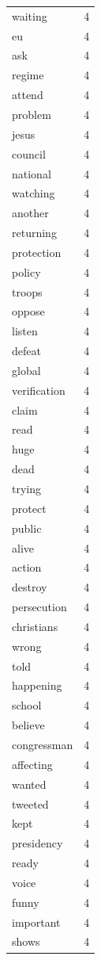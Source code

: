 \begin{tabular}{lr}
waiting & 4 \\
eu & 4 \\
ask & 4 \\
regime & 4 \\
attend & 4 \\
problem & 4 \\
jesus & 4 \\
council & 4 \\
national & 4 \\
watching & 4 \\
another & 4 \\
returning & 4 \\
protection & 4 \\
policy & 4 \\
troops & 4 \\
oppose & 4 \\
listen & 4 \\
defeat & 4 \\
global & 4 \\
verification & 4 \\
claim & 4 \\
read & 4 \\
huge & 4 \\
dead & 4 \\
trying & 4 \\
protect & 4 \\
public & 4 \\
alive & 4 \\
action & 4 \\
destroy & 4 \\
persecution & 4 \\
christians & 4 \\
wrong & 4 \\
told & 4 \\
happening & 4 \\
school & 4 \\
believe & 4 \\
congressman & 4 \\
affecting & 4 \\
wanted & 4 \\
tweeted & 4 \\
kept & 4 \\
presidency & 4 \\
ready & 4 \\
voice & 4 \\
funny & 4 \\
important & 4 \\
shows & 4 \\

\end{tabular}
